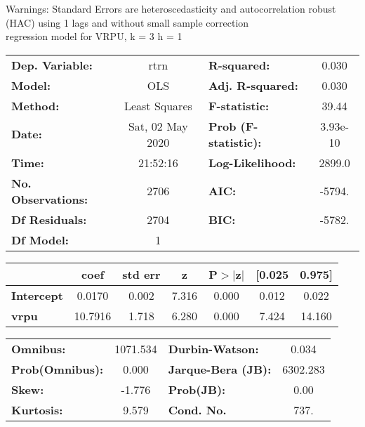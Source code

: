 Warnings: \newline
 [1] Standard Errors are heteroscedasticity and autocorrelation robust (HAC) using 1 lags and without small sample correction\\ 

regression model for VRPU, k = 3 h = 1\begin{center}
\begin{tabular}{lclc}
\toprule
\textbf{Dep. Variable:}    &       rtrn       & \textbf{  R-squared:         } &     0.030   \\
\textbf{Model:}            &       OLS        & \textbf{  Adj. R-squared:    } &     0.030   \\
\textbf{Method:}           &  Least Squares   & \textbf{  F-statistic:       } &     39.44   \\
\textbf{Date:}             & Sat, 02 May 2020 & \textbf{  Prob (F-statistic):} &  3.93e-10   \\
\textbf{Time:}             &     21:52:16     & \textbf{  Log-Likelihood:    } &    2899.0   \\
\textbf{No. Observations:} &        2706      & \textbf{  AIC:               } &    -5794.   \\
\textbf{Df Residuals:}     &        2704      & \textbf{  BIC:               } &    -5782.   \\
\textbf{Df Model:}         &           1      & \textbf{                     } &             \\
\bottomrule
\end{tabular}
\begin{tabular}{lcccccc}
                   & \textbf{coef} & \textbf{std err} & \textbf{z} & \textbf{P$> |$z$|$} & \textbf{[0.025} & \textbf{0.975]}  \\
\midrule
\textbf{Intercept} &       0.0170  &        0.002     &     7.316  &         0.000        &        0.012    &        0.022     \\
\textbf{vrpu}      &      10.7916  &        1.718     &     6.280  &         0.000        &        7.424    &       14.160     \\
\bottomrule
\end{tabular}
\begin{tabular}{lclc}
\textbf{Omnibus:}       & 1071.534 & \textbf{  Durbin-Watson:     } &    0.034  \\
\textbf{Prob(Omnibus):} &   0.000  & \textbf{  Jarque-Bera (JB):  } & 6302.283  \\
\textbf{Skew:}          &  -1.776  & \textbf{  Prob(JB):          } &     0.00  \\
\textbf{Kurtosis:}      &   9.579  & \textbf{  Cond. No.          } &     737.  \\
\bottomrule
\end{tabular}
\end{center}

